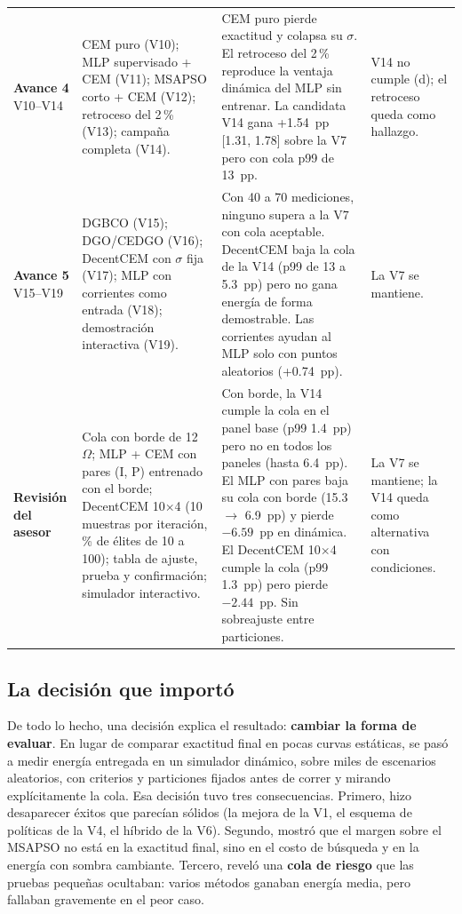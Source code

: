 \documentclass[letterpaper,11pt]{article}
\begin{document}
\begin{table}[H]
\begin{tabularx}{\linewidth}{@{}p{1.55cm}p{4.1cm}Lp{2.9cm}@{}}
    \addlinespace
    \textbf{Avance 4} V10--V14 & CEM puro (V10); MLP supervisado + CEM (V11); MSAPSO corto + CEM (V12); retroceso del 2\,\% (V13); campaña completa (V14). & CEM puro pierde exactitud y colapsa su $\sigma$. El retroceso del 2\,\% reproduce la ventaja dinámica del MLP sin entrenar. La candidata V14 gana +1.54~pp [1.31, 1.78] sobre la V7 pero con cola p99 de 13~pp. & V14 no cumple (d); el retroceso queda como hallazgo. \\
    \addlinespace
    \textbf{Avance 5} V15--V19 & DGBCO (V15); DGO/CEDGO (V16); DecentCEM con $\sigma$ fija (V17); MLP con corrientes como entrada (V18); demostración interactiva (V19). & Con 40 a 70 mediciones, ninguno supera a la V7 con cola aceptable. DecentCEM baja la cola de la V14 (p99 de 13 a 5.3~pp) pero no gana energía de forma demostrable. Las corrientes ayudan al MLP solo con puntos aleatorios (+0.74~pp). & La V7 se mantiene. \\
    \addlinespace
    \textbf{Revisión del asesor} & Cola con borde de 12~$\Omega$; MLP + CEM con pares (I, P) entrenado con el borde; DecentCEM 10$\times$4 (10 muestras por iteración, \% de élites de 10 a 100); tabla de ajuste, prueba y confirmación; simulador interactivo. & Con borde, la V14 cumple la cola en el panel base (p99 1.4~pp) pero no en todos los paneles (hasta 6.4~pp). El MLP con pares baja su cola con borde (15.3 $\rightarrow$ 6.9~pp) y pierde $-6.59$~pp en dinámica. El DecentCEM 10$\times$4 cumple la cola (p99 1.3~pp) pero pierde $-2.44$~pp. Sin sobreajuste entre particiones. & La V7 se mantiene; la V14 queda como alternativa con condiciones. \\
    \bottomrule
  \end{tabularx}
\end{table}

\subsection{La decisión que importó}
De todo lo hecho, una decisión explica el resultado: \textbf{cambiar la forma de evaluar}. En lugar de comparar exactitud final en pocas curvas estáticas, se pasó a medir energía entregada en un simulador dinámico, sobre miles de escenarios aleatorios, con criterios y particiones fijados antes de correr y mirando explícitamente la cola. Esa decisión tuvo tres consecuencias. Primero, hizo desaparecer éxitos que parecían sólidos (la mejora de la V1, el esquema de políticas de la V4, el híbrido de la V6). Segundo, mostró que el margen sobre el MSAPSO no está en la exactitud final, sino en el costo de búsqueda y en la energía con sombra cambiante. Tercero, reveló una \textbf{cola de riesgo} que las pruebas pequeñas ocultaban: varios métodos ganaban energía media, pero fallaban gravemente en el peor caso.
\end{document}
